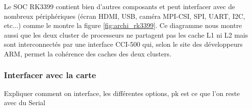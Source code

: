 Le SOC RK3399 contient bien d'autres composants et peut interfacer avec de nombreux périphériques (écran HDMI, USB, caméra MPI-CSI, SPI, UART, I2C, etc...) comme le montre la figure \ref{fig:archi_rk3399}. Ce diagramme nous montre aussi que les deux \gls{cluster} de processeurs ne partagent pas les cache L1 ni L2 mais sont interconnectés par une interface CCI-500 qui, selon le site des développeurs ARM, permet la cohérence des caches des deux clusters.


\subsubsection{Interfacer avec la carte}

\begin{center}
    \color{red}
    Expliquer comment on interface, les différentes options, pk est ce que l'on reste avec du Serial
\end{center}